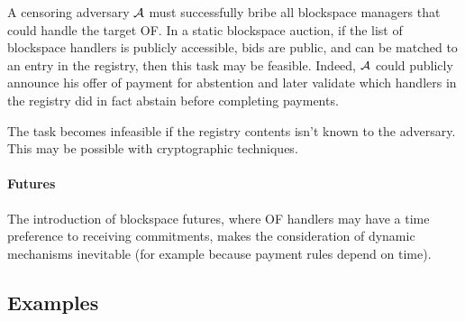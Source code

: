 A censoring adversary $\mathcal{A}$ must successfully bribe all blockspace managers that could handle the target OF.
%
In a static blockspace auction, if the list of blockspace handlers is publicly accessible, bids are public, and can be matched to an entry in the registry, then this task may be feasible.
%
Indeed, $\mathcal{A}$ could publicly announce his offer of payment for abstention and later validate which handlers in the registry did in fact abstain before completing payments.

The task becomes infeasible if the registry contents isn't known to the adversary.
%
This may be possible with cryptographic techniques.

\paragraph{Futures}
%
The introduction of blockspace futures, where OF handlers may have a time preference to receiving commitments, makes the consideration of dynamic mechanisms inevitable (for example because payment rules depend on time).


\subsection{Examples}

